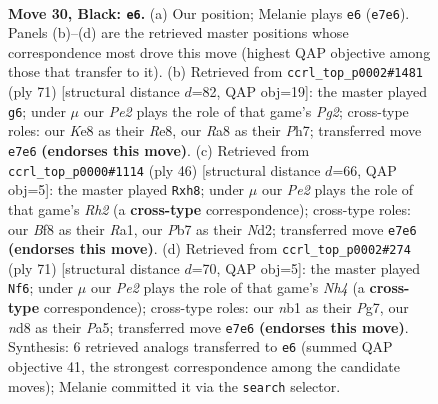 \documentclass[11pt]{article}
\begin{document}
\clearpage

\begin{figure}[p]\centering
\begin{subfigure}{0.46\textwidth}\centering
\resizebox{\linewidth}{!}{%
\newchessgame
\chessboard[
  setfen={r1bNkbn1/ppp1p3/8/P1P5/1n3P2/8/3R4/RNB1K3 b Q - 1 30},
  showmover=false,
  pgfstyle=straightmove, color=movearrow, markmove={e7-e6}
]}
\caption{}
\end{subfigure}\hfill
\begin{subfigure}{0.46\textwidth}\centering
\resizebox{\linewidth}{!}{%
\newchessgame
\chessboard[
  setfen={2b1r2k/1p4pp/1n3b2/r3Np2/5P2/1B4P1/4NK1P/1R1R4 b - - 3 36},
  showmover=false,
  pgfstyle=straightmove, color=movearrow, markmove={g7-g6}
]}
\caption{}
\end{subfigure}
\\[4pt]
\begin{subfigure}{0.46\textwidth}\centering
\resizebox{\linewidth}{!}{%
\newchessgame
\chessboard[
  setfen={2r4r/pp1b2k1/5p2/n2Pp3/4P1p1/3B4/PK1N1PPR/R7 w - - 4 24},
  showmover=false,
  pgfstyle=straightmove, color=movearrow, markmove={h2-h8}
]}
\caption{}
\end{subfigure}\hfill
\begin{subfigure}{0.46\textwidth}\centering
\resizebox{\linewidth}{!}{%
\newchessgame
\chessboard[
  setfen={8/6pk/2ppr3/p3pb1n/2P4P/5P2/P4N2/K2R2R1 b - - 5 36},
  showmover=false,
  pgfstyle=straightmove, color=movearrow, markmove={h5-f6}
]}
\caption{}
\end{subfigure}
\caption{\textbf{Move 30, Black: \texttt{e6}.} (a) Our position; Melanie plays \texttt{e6} (\texttt{e7e6}). Panels (b)--(d) are the retrieved master positions whose correspondence most drove this move (highest QAP objective among those that transfer to it). (b) Retrieved from \texttt{ccrl\_top\_p0002\#1481} (ply 71) [structural distance $d$=82, QAP obj=19]: the master played \texttt{g6}; under $\mu$ our \emph{Pe2} plays the role of that game's \emph{Pg2}; cross-type roles: our \emph{K}e8 as their \emph{R}e8, our \emph{R}a8 as their \emph{P}h7; transferred move \texttt{e7e6} \textbf{(endorses this move)}. (c) Retrieved from \texttt{ccrl\_top\_p0000\#1114} (ply 46) [structural distance $d$=66, QAP obj=5]: the master played \texttt{Rxh8}; under $\mu$ our \emph{Pe2} plays the role of that game's \emph{Rh2} (a \textbf{cross-type} correspondence); cross-type roles: our \emph{B}f8 as their \emph{R}a1, our \emph{P}b7 as their \emph{N}d2; transferred move \texttt{e7e6} \textbf{(endorses this move)}. (d) Retrieved from \texttt{ccrl\_top\_p0002\#274} (ply 71) [structural distance $d$=70, QAP obj=5]: the master played \texttt{Nf6}; under $\mu$ our \emph{Pe2} plays the role of that game's \emph{Nh4} (a \textbf{cross-type} correspondence); cross-type roles: our \emph{n}b1 as their \emph{P}g7, our \emph{n}d8 as their \emph{P}a5; transferred move \texttt{e7e6} \textbf{(endorses this move)}. Synthesis: 6 retrieved analogs transferred to \texttt{e6} (summed QAP objective 41, the strongest correspondence among the candidate moves); Melanie committed it via the \texttt{search} selector.}
\label{fig:thought-m59}
\end{figure}
\end{document}
